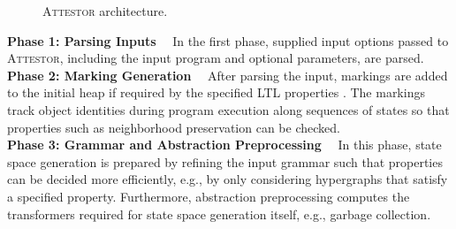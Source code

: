 \documentclass[a4paper, 12pt, twoside]{report}
\begin{document}
\begin{figure}
\begin{center}
{}
			\caption{\textsc{Attestor} architecture. \cite{arndt2018let}}\label{fig:attestor}
		\end{center}
	\end{figure}
	
	\textbf{Phase 1: Parsing Inputs$\quad$}
	In the first phase, supplied input options passed to \textsc{Attestor}, including the input program and optional parameters, are parsed.\\
	
	\textbf{Phase 2: Marking Generation$\quad$} 
	After parsing the input, markings are added to the initial heap if required by the specified LTL properties \cite{heinen2015verifyingPhd}. The markings track object identities during program execution along sequences of states so that properties such as neighborhood preservation can be checked.\\
	
	\textbf{Phase 3: Grammar and Abstraction Preprocessing$\quad$}
	In this phase, state space generation is prepared by refining the input grammar such that properties can be decided more efficiently, e.g., by only considering hypergraphs that satisfy a specified property. Furthermore, abstraction preprocessing computes the transformers required for state space generation itself, e.g., garbage collection.\\ 
	
\end{document}
